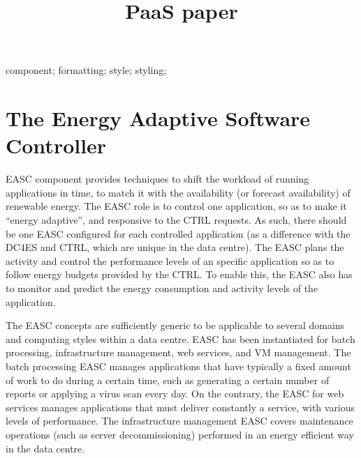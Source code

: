 \documentclass[10pt, conference, compsocconf]{IEEEtran}
\begin{document}
\title{PaaS paper}

\author{
\and
{}
}


\maketitle
\begin{abstract}

\end{abstract}

\begin{IEEEkeywords}
component; formatting; style; styling;

\end{IEEEkeywords}




\section{The Energy Adaptive Software Controller}

EASC component provides techniques to shift the workload of running applications in time, to match it with the availability (or forecast availability) of renewable energy. The EASC role is to control one application, so as to make it “energy adaptive”, and responsive to the CTRL requests. As such, there should be one EASC configured for each controlled application (as a difference with the DC4ES and CTRL, which are unique in the data centre). The EASC plans the activity and control the performance levels of an specific application so as to follow energy budgets provided by the CTRL. To enable this, the EASC also has to monitor and predict the energy consumption and activity levels of the application.

The EASC concepts are sufficiently generic to be applicable to several domains and computing styles within a data centre. EASC has been instantiated for batch processing, infrastructure management, web services, and VM management. The batch processing EASC manages applications that have typically a fixed amount of work to do during a certain time, such as generating a certain number of reports or applying a virus scan every day. On the contrary, the EASC for web services manages applications that must deliver constantly a service, with various levels of performance. The infrastructure management EASC covers maintenance operations (such as server decommissioning) performed in an energy efficient way in the data centre.
\end{document}

